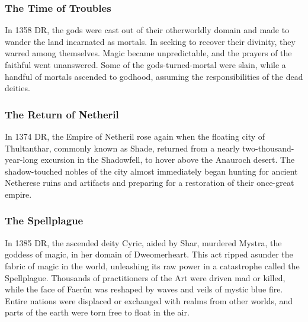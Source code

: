 \documentclass[10pt,a4paper,twoside,twocolumn,openany,bg=print,nodeprecatedcode]{dndbook}
\begin{document}
\subsubsection{The Time of Troubles}
In 1358 DR, the gods were cast out of their otherworldly domain and made to wander the land incarnated as mortals. In seeking to recover their divinity, they warred among themselves. Magic became unpredictable, and the prayers of the faithful went unanswered. Some of the gods-turned-mortal were slain, while a handful of mortals ascended to godhood, assuming the responsibilities of the dead deities.
\subsubsection{The Return of Netheril}
In 1374 DR, the Empire of Netheril rose again when the floating city of Thultanthar, commonly known as Shade, returned from a nearly two-thousand-year-long excursion in the Shadowfell, to hover above the Anauroch desert. The shadow-touched nobles of the city almost immediately began hunting for ancient Netherese ruins and artifacts and preparing for a restoration of their once-great empire.
\subsubsection{The Spellplague}
In 1385 DR, the ascended deity Cyric, aided by Shar, murdered Mystra, the goddess of magic, in her domain of Dweomerheart. This act ripped asunder the fabric of magic in the world, unleashing its raw power in a catastrophe called the Spellplague. Thousands of practitioners of the Art were driven mad or killed, while the face of Faerûn was reshaped by waves and veils of mystic blue fire. Entire nations were displaced or exchanged with realms from other worlds, and parts of the earth were torn free to float in the air.
\end{document}
